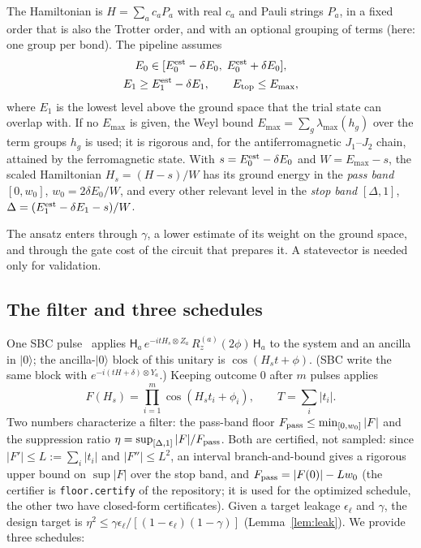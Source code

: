 \documentclass[aps,pra,twocolumn,superscriptaddress,nofootinbib]{revtex4-2}
\newcommand{\ket}[1]{|#1\rangle}
\begin{document}
The Hamiltonian is $H=\sum_a c_aP_a$ with real $c_a$ and Pauli strings $P_a$, in a fixed order that is
also the Trotter order, and with an optional grouping of terms (here: one group per bond). The pipeline
assumes
\begin{equation}
\begin{gathered}
E_0\in[E_0^{\rm est}-\delta E_0,\;E_0^{\rm est}+\delta E_0],\\
E_1\ge E_1^{\rm est}-\delta E_1,\qquad E_{\rm top}\le E_{\max},
\end{gathered}
\label{eq:assumptions}
\end{equation}
where $E_1$ is the lowest level above the ground space that the trial state can overlap with. If no
$E_{\max}$ is given, the Weyl bound $E_{\max}=\sum_g\lambda_{\max}(h_g)$ over the term groups $h_g$ is
used; it is rigorous and, for the antiferromagnetic $J_1$--$J_2$ chain, attained by the ferromagnetic
state. With $s=E_0^{\rm est}-\delta E_0$ and $W=E_{\max}-s$, the scaled Hamiltonian $H_s=(H-s)/W$ has its
ground energy in the \emph{pass band} $[0,w_0]$, $w_0=2\delta E_0/W$, and every other relevant level in
the \emph{stop band} $[\Delta,1]$, $\Delta=(E_1^{\rm est}-\delta E_1-s)/W$.

The ansatz enters through $\gamma$, a lower estimate of its weight on the ground space, and through the
gate cost of the circuit that prepares it. A statevector is needed only for validation.

\subsection{The filter and three schedules}

One SBC pulse~\cite{Stetcu2023} applies $\mathsf H_a\,e^{-itH_s\otimes Z_a}\,R_z^{(a)}(2\phi)\,\mathsf H_a$
to the system and an ancilla in $\ket0$; the ancilla-$\ket0$ block of this unitary is
$\cos(H_st+\phi)$. (SBC write the same block with $e^{-i(tH+\delta)\otimes Y_a}$.) Keeping outcome 0
after $m$ pulses applies
\begin{equation}
F(H_s)=\prod_{i=1}^m\cos(H_st_i+\phi_i),\qquad T=\sum_i|t_i|.
\end{equation}
Two numbers characterize a filter: the pass-band floor $F_{\rm pass}\le\min_{[0,w_0]}|F|$ and the
suppression ratio $\eta=\sup_{[\Delta,1]}|F|/F_{\rm pass}$. Both are certified, not sampled: since
$|F'|\le L:=\sum_i|t_i|$ and $|F''|\le L^2$, an interval branch-and-bound gives a rigorous upper bound
on $\sup|F|$ over the stop band, and $F_{\rm pass}=|F(0)|-Lw_0$ (the certifier is
\texttt{floor.certify} of the repository; it is used for the optimized schedule, the other two have
closed-form certificates). Given a target leakage $\epsilon_\ell$ and $\gamma$, the
design target is $\eta^2\le\gamma\epsilon_\ell/[(1-\epsilon_\ell)(1-\gamma)]$ (Lemma~\ref{lem:leak}).
We provide three schedules:
\end{document}

